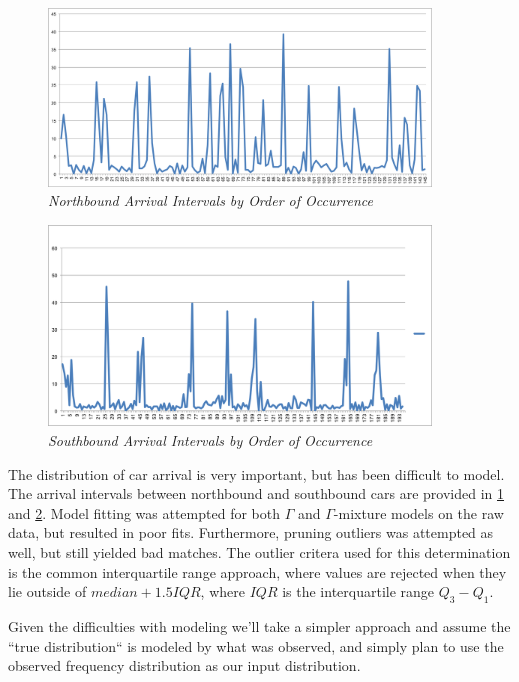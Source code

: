 \documentclass[a4paper,12pt]{article}
\begin{document}
\begin{figure}
\begin{center}  
\includegraphics[width=4in]{../northbound.png}  
\caption{\small \sl Northbound Arrival Intervals by Order of Occurrence\label{fig:northbound_arrival}}  
\end{center}  
\end{figure} 

\begin{figure}  
\begin{center}
\includegraphics[width=4in]{../southbound.png}
\caption{\small \sl Southbound Arrival Intervals by Order of Occurrence\label{fig:southbound_arrival}}  
\end{center}  
\end{figure} 

The distribution of car arrival is very important, but has been difficult to model. The arrival intervals between 
northbound and southbound cars are provided in \ref{fig:northbound_arrival} and \ref{fig:southbound_arrival}.
Model fitting was attempted for both $\Gamma$ and $\Gamma$-mixture models on the raw data, but resulted in poor
fits. Furthermore, pruning outliers was attempted as well, but still yielded bad matches. The outlier critera used for
this determination is the common interquartile range approach, where values are rejected when
they lie outside of $median + 1.5IQR$, where $IQR$ is the interquartile range $Q_3 - Q_1$.

Given the difficulties with modeling we'll take a simpler approach and assume the ``true distribution`` is modeled by what was observed,
and simply plan to use the observed frequency distribution as our input distribution.
\end{document}
